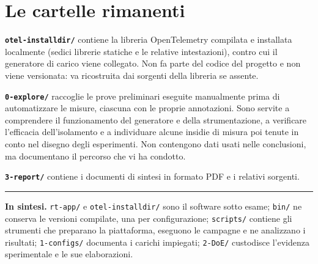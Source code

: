 \section{Le cartelle rimanenti}

\textbf{\texttt{otel-installdir/}} contiene la libreria OpenTelemetry compilata e installata
localmente (sedici librerie statiche e le relative intestazioni), contro cui il generatore di carico
viene collegato. Non fa parte del codice del progetto e non viene versionata: va ricostruita dai
sorgenti della libreria se assente.

\textbf{\texttt{0-explore/}} raccoglie le prove preliminari eseguite manualmente prima di
automatizzare le misure, ciascuna con le proprie annotazioni. Sono servite a comprendere il
funzionamento del generatore e della strumentazione, a verificare l'efficacia dell'isolamento e a
individuare alcune insidie di misura poi tenute in conto nel disegno degli esperimenti. Non
contengono dati usati nelle conclusioni, ma documentano il percorso che vi ha condotto.

\textbf{\texttt{3-report/}} contiene i documenti di sintesi in formato PDF e i relativi sorgenti.

\vspace{.8em}
\hrule
\vspace{.6em}

\small
\textbf{In sintesi.} \texttt{rt-app/} e \texttt{otel-installdir/} sono il software sotto esame;
\texttt{bin/} ne conserva le versioni compilate, una per configurazione; \texttt{scripts/} contiene
gli strumenti che preparano la piattaforma, eseguono le campagne e ne analizzano i risultati;
\texttt{1-configs/} documenta i carichi impiegati; \texttt{2-DoE/} custodisce l'evidenza
sperimentale e le sue elaborazioni.


